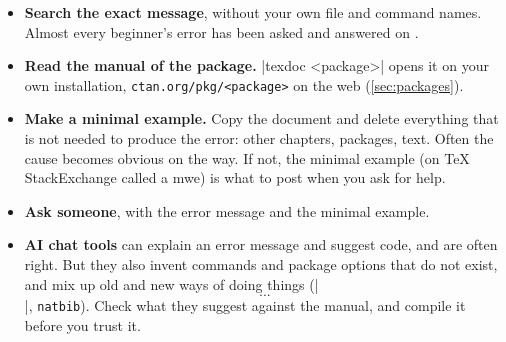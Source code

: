 \begin{itemize}
    \item \textbf{Search the exact message}, without your own file and command names.
        Almost every beginner's error has been asked and answered on
        .
    \item \textbf{Read the manual of the package.}
        \code|texdoc <package>| opens it on your own installation,
        \texttt{ctan.org/pkg/<package>} on the web (\autoref{sec:packages}).
    \item \textbf{Make a minimal example.}
        Copy the document and delete everything that is not needed to produce the error:
        other chapters, packages, text.
        Often the cause becomes obvious on the way.
        If not, the minimal example (on TeX StackExchange called a \gls{mwe}) is what to post when you ask for help.
    \item \textbf{Ask someone}, with the error message and the minimal example.
    \item \textbf{AI chat tools} can explain an error message and suggest code, and are often right.
        But they also invent commands and package options that do not exist,
        and mix up old and new ways of doing things (\code|$$...$$|, \texttt{natbib}).
        Check what they suggest against the manual, and compile it before you trust it.
\end{itemize}
